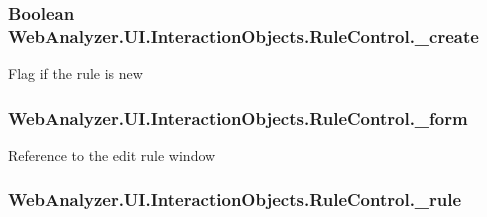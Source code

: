 \subsubsection[{\+\_\+create}]{\setlength{\rightskip}{0pt plus 5cm}Boolean Web\+Analyzer.\+U\+I.\+Interaction\+Objects.\+Rule\+Control.\+\_\+create\hspace{0.3cm}{\ttfamily [private]}}\label{class_web_analyzer_1_1_u_i_1_1_interaction_objects_1_1_rule_control_af8af0b3b5216da52d2173d358c1f8928}


Flag if the rule is new 

\hypertarget{class_web_analyzer_1_1_u_i_1_1_interaction_objects_1_1_rule_control_a438aa401b03c23242fce60f06efb3b48}{}
\subsubsection[{\+\_\+form}]{ Web\+Analyzer.\+U\+I.\+Interaction\+Objects.\+Rule\+Control.\+\_\+form\hspace{0.3cm}{\ttfamily [private]}}\label{class_web_analyzer_1_1_u_i_1_1_interaction_objects_1_1_rule_control_a438aa401b03c23242fce60f06efb3b48}


Reference to the edit rule window 

\hypertarget{class_web_analyzer_1_1_u_i_1_1_interaction_objects_1_1_rule_control_aa89ec17ff2fc96e2868147d3a1bfe474}{}
\subsubsection[{\+\_\+rule}]{ Web\+Analyzer.\+U\+I.\+Interaction\+Objects.\+Rule\+Control.\+\_\+rule\hspace{0.3cm}{\ttfamily [private]}}\label{class_web_analyzer_1_1_u_i_1_1_interaction_objects_1_1_rule_control_aa89ec17ff2fc96e2868147d3a1bfe474}


